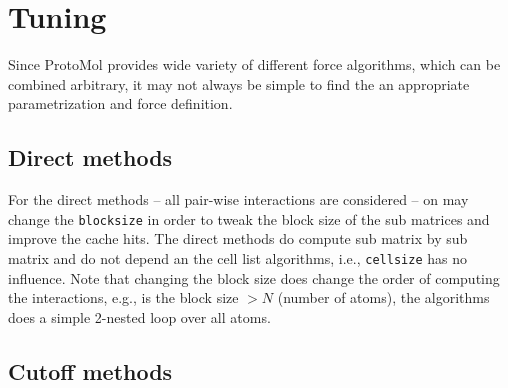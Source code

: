 \documentclass[11pt]{article}
\begin{document}
\clearpage
\section{Tuning }

Since {\sc ProtoMol} provides wide variety of different force
algorithms, which can be combined arbitrary, it may not always be simple to
find the an appropriate parametrization and force definition.

\subsection{Direct methods}

For the direct methods --  all pair-wise interactions are considered
-- on may change the \texttt{blocksize} in order to tweak the block size of
the sub matrices and improve the cache hits. The direct methods do compute sub matrix by sub
matrix and do not depend an the cell list algorithms, i.e.,
\texttt{cellsize} has no influence. Note that changing the block size does change the
order of computing the interactions, e.g., is the block size $> N$
(number of atoms), the algorithms does a simple 2-nested loop over all
atoms. 
 

\subsection{Cutoff methods}
\end{document}
